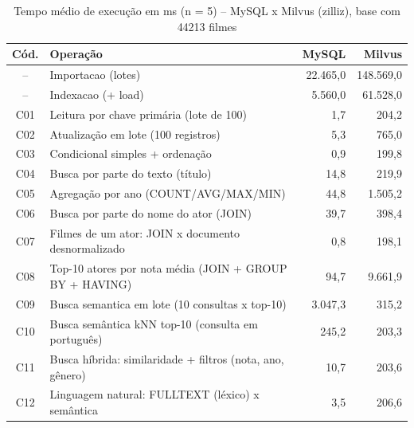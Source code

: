 \begin{table}[ht]
\centering
\caption{Tempo médio de execução em ms (n = 5) -- MySQL x Milvus (zilliz), base com 44213 filmes}
\label{tab:resultados}
\small
\begin{tabular}{|c|l|r|r|}
\hline
\textbf{Cód.} & \textbf{Operação} & \textbf{MySQL} & \textbf{Milvus} \\ \hline
-- & Importacao (lotes) & 22.465,0 & 148.569,0 \\ \hline
-- & Indexacao (+ load) & 5.560,0 & 61.528,0 \\ \hline
C01 & Leitura por chave primária (lote de 100) & 1,7 & 204,2 \\ \hline
C02 & Atualização em lote (100 registros) & 5,3 & 765,0 \\ \hline
C03 & Condicional simples + ordenação & 0,9 & 199,8 \\ \hline
C04 & Busca por parte do texto (título) & 14,8 & 219,9 \\ \hline
C05 & Agregação por ano (COUNT/AVG/MAX/MIN) & 44,8 & 1.505,2 \\ \hline
C06 & Busca por parte do nome do ator (JOIN) & 39,7 & 398,4 \\ \hline
C07 & Filmes de um ator: JOIN x documento desnormalizado & 0,8 & 198,1 \\ \hline
C08 & Top-10 atores por nota média (JOIN + GROUP BY + HAVING) & 94,7 & 9.661,9 \\ \hline
C09 & Busca semantica em lote (10 consultas x top-10) & 3.047,3 & 315,2 \\ \hline
C10 & Busca semântica kNN top-10 (consulta em português) & 245,2 & 203,3 \\ \hline
C11 & Busca híbrida: similaridade + filtros (nota, ano, gênero) & 10,7 & 203,6 \\ \hline
C12 & Linguagem natural: FULLTEXT (léxico) x semântica & 3,5 & 206,6 \\ \hline
\end{tabular}
\end{table}
